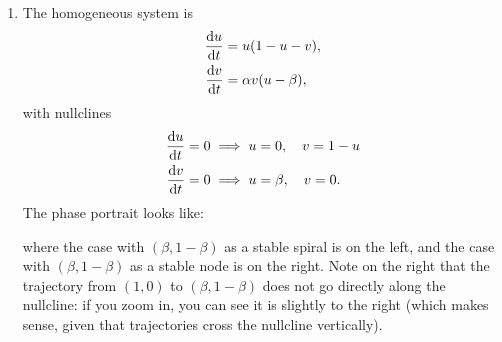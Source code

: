 \documentclass[a4paper,12pt]{article}
\begin{document}
\begin{enumerate}[leftmargin=0.6cm]
    { %
      \begin{enumerate}
        \item The homogeneous system is
          \begin{subequations}
            \begin{align}
              \fd{u}{t} &= u(1-u-v),\\
              \fd{v}{t} &= \alpha v (u-\beta),
            \end{align}
          \end{subequations}
          with nullclines
          \begin{subequations}
            \begin{align}
              \fd{u}{t} = 0 &\implies u = 0, \quad v = 1 - u\\
              \fd{v}{t} = 0 &\implies u = \beta, \quad v = 0.
            \end{align}
          \end{subequations}
          The phase portrait looks like:
          \begin{center}
            \hspace{-2cm}
            
            
          \end{center}
          where the case with $(\beta,1-\beta)$ as a stable spiral is on the left, and the case with $(\beta,1-\beta)$ as a stable node is on the right. Note on the right that the trajectory from $(1,0)$ to $(\beta,1-\beta)$ does not go directly along the nullcline: if you zoom in, you can see it is slightly to the right (which makes sense, given that trajectories cross the nullcline vertically).
\end{enumerate}}
\end{enumerate}
\end{document}

